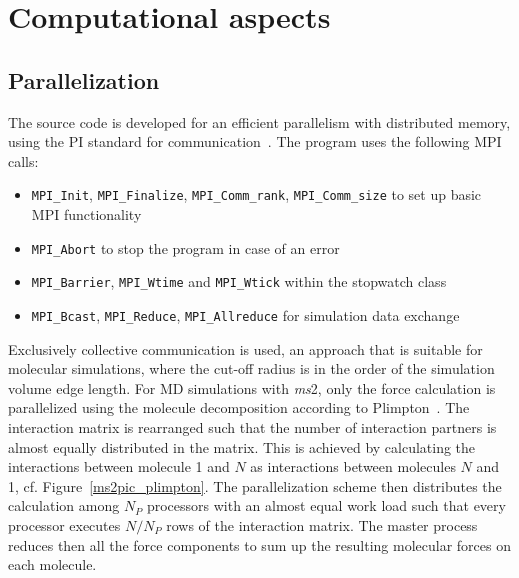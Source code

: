 



\chapter{Computational aspects}
\label{sec:Computational Aspects}
% 





\section{Parallelization}
\label{sec:Parallelization}
% 

The source code is developed for an efficient parallelism with distributed memory, using the PI standard for communication~\parencite{Forum2009}. The program uses the following MPI calls:
\begin{itemize}
	\item \lstinline{MPI_Init}, \lstinline{MPI_Finalize}, \lstinline{MPI_Comm_rank}, \lstinline{MPI_Comm_size} to set up basic MPI functionality
	\item \lstinline{MPI_Abort} to stop the program in case of an error
	\item \lstinline{MPI_Barrier}, \lstinline{MPI_Wtime} and \lstinline{MPI_Wtick} within the stopwatch class
	\item \lstinline{MPI_Bcast}, \lstinline{MPI_Reduce}, \lstinline{MPI_Allreduce} for simulation data exchange
\end{itemize}
Exclusively collective communication is used, an approach that is suitable for molecular simulations, where the cut-off radius is in the order of the simulation volume edge length. For MD simulations with \textit{ms}2, only the force calculation is parallelized using the molecule decomposition according to Plimpton~\parencite{plimpton}. The interaction matrix is rearranged such that the number of interaction partners is almost equally distributed in the matrix. This is achieved by calculating the interactions between molecule 1 and $N$ as interactions between molecules $N$ and 1, cf. Figure~\ref{ms2pic_plimpton}. The parallelization scheme then distributes the calculation among $N_P$ processors with an almost equal work load such that every processor executes $N/N_P$ rows of the interaction matrix. The master process reduces then all the force components to sum up the resulting molecular forces on each molecule.


